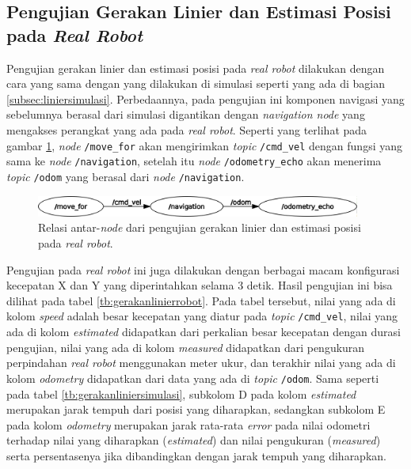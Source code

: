 \subsection{Pengujian Gerakan Linier dan Estimasi Posisi pada \emph{Real Robot}}
\label{subsec:linierrobot}

Pengujian gerakan linier dan estimasi posisi pada \emph{real robot} dilakukan dengan cara yang sama dengan yang dilakukan di simulasi seperti yang ada di bagian \ref{subsec:liniersimulasi}.
Perbedaannya, pada pengujian ini komponen navigasi yang sebelumnya berasal dari simulasi digantikan dengan \emph{navigation node} yang mengakses perangkat yang ada pada \emph{real robot}.
Seperti yang terlihat pada gambar \ref{fig:rosgraphnavigation},
  \emph{node} \lstinline{/move_for} akan mengirimkan \emph{topic} \lstinline{/cmd_vel} dengan fungsi yang sama ke \emph{node} \lstinline{/navigation},
  setelah itu \emph{node} \lstinline{/odometry_echo} akan menerima \emph{topic} \lstinline{/odom} yang berasal dari \emph{node} \lstinline{/navigation}.

\begin{figure}[ht]
  \centering
  \includegraphics[width=0.95\textwidth,keepaspectratio]{gambar/rosgraph-navigation.png}
  \caption{Relasi antar-\emph{node} dari pengujian gerakan linier dan estimasi posisi pada \emph{real robot}.}
  \label{fig:rosgraphnavigation}
\end{figure}

Pengujian pada \emph{real robot} ini juga dilakukan dengan berbagai macam konfigurasi kecepatan X dan Y yang diperintahkan selama 3 detik.
Hasil pengujian ini bisa dilihat pada tabel \ref{tb:gerakanlinierrobot}.
Pada tabel tersebut, nilai yang ada di kolom \emph{speed} adalah besar kecepatan yang diatur pada \emph{topic} \lstinline{/cmd_vel},
  nilai yang ada di kolom \emph{estimated} didapatkan dari perkalian besar kecepatan dengan durasi pengujian,
  nilai yang ada di kolom \emph{measured} didapatkan dari pengukuran perpindahan \emph{real robot} menggunakan meter ukur,
  dan terakhir nilai yang ada di kolom \emph{odometry} didapatkan dari data yang ada di \emph{topic} \lstinline{/odom}.
Sama seperti pada tabel \ref{tb:gerakanliniersimulasi},
  subkolom D pada kolom \emph{estimated} merupakan jarak tempuh dari posisi yang diharapkan,
  sedangkan subkolom E pada kolom \emph{odometry} merupakan jarak rata-rata \emph{error} pada nilai odometri terhadap nilai yang diharapkan (\emph{estimated}) dan nilai pengukuran (\emph{measured}) serta persentasenya jika dibandingkan dengan jarak tempuh yang diharapkan.


